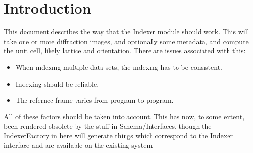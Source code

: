 \documentclass[a4paper, 11pt]{article}
\begin{document}
\section{Introduction}

This document describes the way that the Indexer module should work. This will
take one or more diffraction images, and optionally some metadata, and
compute the unit cell, likely lattice and orientation. There are issues 
associated with this:

\begin{itemize}
\item{When indexing multiple data sets, the indexing has to be consistent.}
\item{Indexing should be reliable.}
\item{The refernce frame varies from program to program.}
\end{itemize}

All of these factors should be taken into account. This has now, to some 
extent, been rendered obsolete by the stuff in Schema/Interfaces, though the
IndexerFactory in here will generate things which correspond to the Indexer
interface and are available on the existing system.
\end{document}
